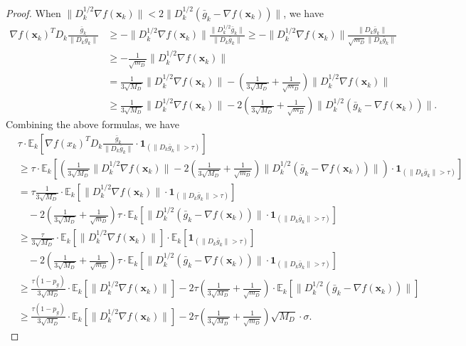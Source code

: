\documentclass{article}
\newcommand{\bx}{\boldsymbol{x}}
\newcommand{\barg}{\bar{g}}
\theoremstyle{plain}
\theoremstyle{definition}
\theoremstyle{remark}
\begin{document}
\begin{proof}
When $\|D_k^{1/2}\nabla f(\bx_k)\|<2\|D_k^{1/2}(\barg_k-\nabla f(\bx_k))\|$, we have
\begin{align*}
    \nabla f(\bx_k)^TD_k\frac{\barg_k}{\|D_k\barg_k\|} & \geq - \| D_k^{1/2}\nabla f(\bx_k)\| \frac{\| D_k^{1/2}\barg_k\|}{\|D_k\barg_k\|} \geq - \| D_k^{1/2}\nabla f(\bx_k)\| \frac{\| D_k\barg_k\|}{\sqrt{m_D} \|D_k\barg_k\|}\\
   & \geq - \frac{1}{\sqrt{m_D}}\| D_k^{1/2}\nabla f(\bx_k)\|\\
   & =  \frac{1}{3\sqrt{M_D}}\| D_k^{1/2}\nabla f(\bx_k)\| - \left( \frac{1}{3\sqrt{M_D}} + \frac{1}{\sqrt{m_D}}\right)\| D_k^{1/2}\nabla f(\bx_k)\| \\
   & \geq \frac{1}{3\sqrt{M_D}}\| D_k^{1/2}\nabla f(\bx_k)\| - 2\left( \frac{1}{3\sqrt{M_D}} + \frac{1}{\sqrt{m_D}}\right)\| D_k^{1/2}(\barg_k-\nabla f(\bx_k))\|.
\end{align*}
Combining the above formulas, we have
\begin{align*}
   & \tau \cdot \mathbb{E}_k\left[\nabla f(x_k)^T D_k \frac{\bar{g}_k}{\|D_k\bar{g}_k\|} \cdot \boldsymbol{1}_{(\|D_k\bar{g}_k\| > \tau)} \right] \\
   & \geq  
   \tau \cdot \mathbb{E}_k\left[\left(\frac{1}{3\sqrt{M_D}}\| D_k^{1/2}\nabla f(\bx_k)\| - 2\left( \frac{1}{3\sqrt{M_D}} + \frac{1}{\sqrt{m_D}}\right)\| D_k^{1/2}(\barg_k-\nabla f(\bx_k))\|\right) \cdot \boldsymbol{1}_{(\|D_k\bar{g}_k\| > \tau)} \right] \\
   & = \tau \frac{1}{3\sqrt{M_D}} \cdot \mathbb{E}_k\left[\| D_k^{1/2}\nabla f(\bx_k)\| \cdot \boldsymbol{1}_{(\|D_k\bar{g}_k\| > \tau) } \right]  \\
   & \quad - 2\left( \frac{1}{3\sqrt{M_D}} + \frac{1}{\sqrt{m_D}}\right) \tau \cdot \mathbb{E}_k\left[ \| D_k^{1/2}(\barg_k-\nabla f(\bx_k))\|\cdot \boldsymbol{1}_{(\|D_k\bar{g}_k\| > \tau)} \right] \\
   & \geq \frac{\tau}{3\sqrt{M_D}} \cdot \mathbb{E}_k\left[\| D_k^{1/2}\nabla f(\bx_k)\|\right] \cdot \mathbb{E}_k\left[\boldsymbol{1}_{(\|D_k\bar{g}_k\| > \tau)} \right]  \\
   & \quad - 2\left( \frac{1}{3\sqrt{M_D}} + \frac{1}{\sqrt{m_D}}\right) \tau \cdot \mathbb{E}_k\left[ \| D_k^{1/2}(\barg_k-\nabla f(\bx_k))\|\cdot \boldsymbol{1}_{(\|D_k\bar{g}_k\| > \tau) } \right] \\
   & \geq  \frac{\tau (1-p_g)}{3\sqrt{M_D}} \cdot \mathbb{E}_k\left[\| D_k^{1/2}\nabla f(\bx_k)\|\right]  - 2\tau \left( \frac{1}{3\sqrt{M_D}} + \frac{1}{\sqrt{m_D}}\right)  \cdot \mathbb{E}_k\left[ \| D_k^{1/2}(\barg_k-\nabla f(\bx_k))\|  \right] \\
   & \geq \frac{\tau (1-p_g)}{3\sqrt{M_D}} \cdot \mathbb{E}_k\left[\| D_k^{1/2}\nabla f(\bx_k)\|\right]  - 2\tau \left( \frac{1}{3\sqrt{M_D}} + \frac{1}{\sqrt{m_D}}\right) \sqrt{M_D} \cdot \sigma .
\end{align*}


\end{proof}
\end{document}
